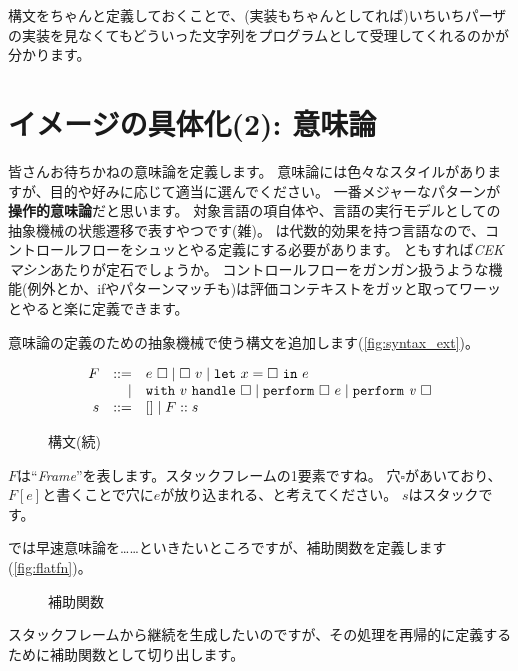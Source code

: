\documentclass{ltjsarticle}
\begin{document}
構文をちゃんと定義しておくことで、(実装もちゃんとしてれば)いちいちパーザの実装を見なくてもどういった文字列をプログラムとして受理してくれるのかが分かります。

\newpage
\section{イメージの具体化(2): 意味論}
皆さんお待ちかねの意味論を定義します。
意味論には色々なスタイルがありますが、目的や好みに応じて適当に選んでください。
一番メジャーなパターンが\textbf{操作的意味論}だと思います。
対象言語の項自体や、言語の実行モデルとしての抽象機械の状態遷移で表すやつです(雑)。
\lambdaeff{}は代数的効果を持つ言語なので、コントロールフローをシュッとやる定義にする必要があります。
ともすれば\textit{CEKマシン}あたりが定石でしょうか。
コントロールフローをガンガン扱うような機能(例外とか、ifやパターンマッチも)は評価コンテキストをガッと取ってワーッとやると楽に定義できます。

意味論の定義のための抽象機械で使う構文を追加します(\autoref{fig:syntax_ext})。

\begin{figure}[ht]
  \centering

  \begin{tcolorbox}
    \[
      \begin{array}{rrl}
        F & ::= & e\ \square \mid \square\ v \mid \letT{x}{\square}{e} \\
          &\mid & \withhandle{v\ }{\square} \mid \perform{\square\ }{e} \mid \perform{\variable{v\ }}{\square}\\
        s &::= & \left[\right] \mid F :: s
      \end{array}
    \]
  \end{tcolorbox}

  \caption{構文(続)}
  \label{fig:syntax_ext}
\end{figure}
$F$は``\textit{Frame}''を表します。スタックフレームの1要素ですね。
穴$\square$があいており、$F\left[e\right]$と書くことで穴に$e$が放り込まれる、と考えてください。
$s$はスタックです。

では早速意味論を……といきたいところですが、補助関数を定義します(\autoref{fig:flatfn})。
\newcommand{\flatfn}[1]{%
  \variable{flatfn}\ #1
}

\begin{figure}[ht]

  \caption{補助関数}
  \label{fig:flatfn}
\end{figure}
スタックフレームから継続を生成したいのですが、その処理を再帰的に定義するために補助関数として切り出します。
\end{document}
